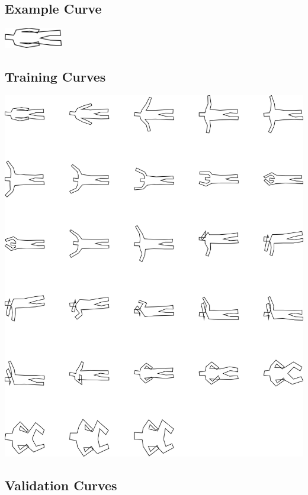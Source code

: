 \subsection{Example Curve}

\includegraphics[width=1in]{output/3.learning/learning_setup/learning_setup_examples_.png}
\subsection{Training Curves}

\includegraphics[width=6in]{output/3.learning/learning_setup/learning_setup_training_.png}
\subsection{Validation Curves}

